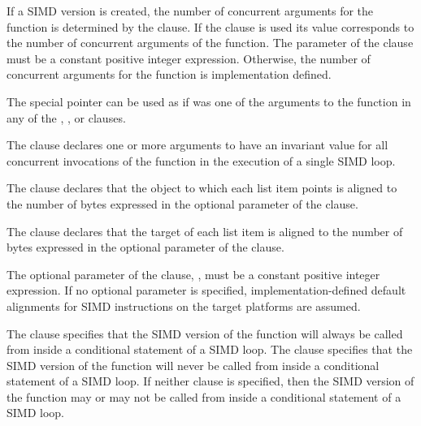 If a SIMD version is created, the number of concurrent arguments for the function is
determined by the  clause. If the  clause is used its value
corresponds to the number of concurrent arguments of the function. The parameter of
the  clause must be a constant positive integer expression. Otherwise, the
number of concurrent arguments for the function is implementation defined.

\begin{cppspecific}
The special  pointer can be used as if was one of the arguments to the function in any of the , , or  clauses.
\end{cppspecific}

The  clause declares one or more arguments to have an invariant value for all
concurrent invocations of the function in the execution of a single SIMD loop.

\begin{samepage}
\begin{ccppspecific}
The  clause declares that the object to which each list item points is aligned to
the number of bytes expressed in the optional parameter of the  clause.
\end{ccppspecific}
\end{samepage}

\begin{samepage}
\begin{fortranspecific}
The  clause declares that the target of each list item is aligned to the number
of bytes expressed in the optional parameter of the  clause.
\end{fortranspecific}
\end{samepage}

The optional parameter of the  clause, , must be a constant positive
integer expression. If no optional parameter is specified, implementation-defined default
alignments for SIMD instructions on the target platforms are assumed.

The  clause specifies that the SIMD version of the function will always be called from inside a
conditional statement of a SIMD loop. The  clause specifies that the
SIMD version of the function will never be called from inside a conditional statement of a SIMD loop. If
neither clause is specified, then the SIMD version of the function may or may not be called from inside a
conditional statement of a SIMD loop.

